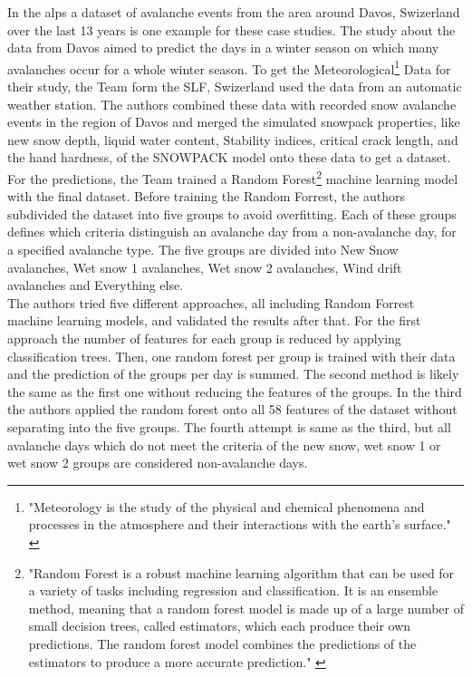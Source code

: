\documentclass[../masterarbeit.tex]{subfiles}
\begin{document}
In the alps a dataset of avalanche events from the area around Davos, Swizerland \textcite[]{Harvey:2016} over the last 13 years is one example for these case studies. The study about the data from Davos aimed to predict the days in a winter season on which many avalanches occur for a whole winter season.
To get the Meteorological\footnote{ "Meteorology is the study of the physical and chemical phenomena and processes in the atmosphere and their interactions with the earth's surface." \autocite[]{dwd:2022} } Data for their study, the Team form the SLF, Swizerland used the data from an automatic weather station.
The authors combined these data with recorded snow avalanche events in the region of Davos and merged the simulated snowpack properties, like new snow depth, liquid water content, Stability indices, critical crack length, and the hand hardness, of the SNOWPACK model onto these data to get a dataset. For the predictions, the Team trained a Random Forest\footnote{ "Random Forest is a robust machine learning algorithm that can be used for a variety of tasks including regression and classification. It is an ensemble method, meaning that a random forest model is made up of a large number of small decision trees, called estimators, which each produce their own predictions. The random forest model combines the predictions of the estimators to produce a more accurate prediction." \autocite{DeepAI:2022}}  machine learning model with the final dataset. Before training the Random Forrest, the authors subdivided the dataset into five groups to avoid overfitting. Each of these groups defines which criteria distinguish an avalanche day from a non-avalanche day, for a specified avalanche type. The five groups are divided into New Snow avalanches, Wet snow 1 avalanches, Wet snow 2 avalanches, Wind drift avalanches and Everything else. \autocite[]{Harvey:2016}\\
The authors tried five different approaches, all including Random Forrest machine learning models, and validated the results after that.
For the first approach the number of features for each group is reduced by applying classification trees. Then, one random forest per group is trained with their data and the prediction of the groups per day is summed.
The second method is likely the same as the first one without reducing the features of the groups.
In the third the authors applied the random forest onto all 58 features of the dataset without separating into the five groups.
The fourth attempt is same as the third, but all avalanche days which do not meet the criteria of the new snow, wet snow 1 or wet snow 2 groups are considered non-avalanche days.
\end{document}
